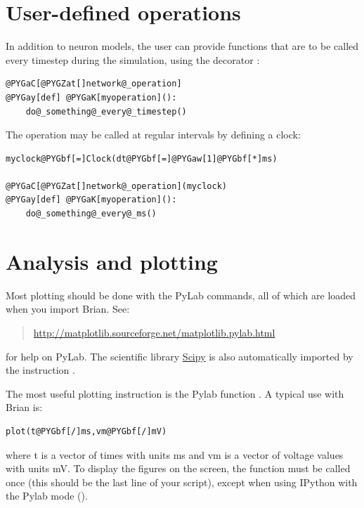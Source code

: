 \documentclass[letterpaper,10pt,english]{manual}
\begin{document}
\section{User-defined operations}

In addition to neuron models, the user can provide functions that are to be called every timestep
during the simulation, using the decorator \hyperlink{brian.network_operation}{}:

\begin{Verbatim}[commandchars=@\[\]]
@PYGaC[@PYGZat[]network@_operation]
@PYGay[def] @PYGaK[myoperation]():
    do@_something@_every@_timestep()
\end{Verbatim}

The operation may be called at regular intervals by defining a clock:

\begin{Verbatim}[commandchars=@\[\]]
myclock@PYGbf[=]Clock(dt@PYGbf[=]@PYGaw[1]@PYGbf[*]ms)

@PYGaC[@PYGZat[]network@_operation](myclock)
@PYGay[def] @PYGaK[myoperation]():
    do@_something@_every@_ms()
\end{Verbatim}

\resetcurrentobjects
\hypertarget{--doc-analysis}{}

\hypertarget{index-0}{}\section{Analysis and plotting}
Most plotting should be done with the PyLab commands, all of
which are loaded when you import Brian. See:
\begin{quote}

\href{http://matplotlib.sourceforge.net/matplotlib.pylab.html}{http://matplotlib.sourceforge.net/matplotlib.pylab.html}
\end{quote}

for help on PyLab. The scientific library \href{http://www.scipy.org}{Scipy} is also automatically
imported by the instruction .

The most useful plotting instruction is the Pylab function . A typical use with Brian is:

\begin{Verbatim}[commandchars=@\[\]]
plot(t@PYGbf[/]ms,vm@PYGbf[/]mV)
\end{Verbatim}

where t is a vector of times with units ms and vm is a vector of voltage values with units mV.
To display the figures on the screen, the function  must be called once (this should be the
last line of your script), except when using IPython with the Pylab mode ().
\end{document}
